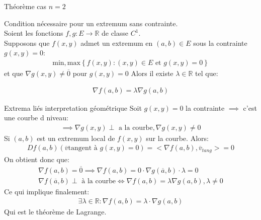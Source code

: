 \begin{parag}{Théorème cas $n = 2$}
    \begin{theoreme}
    Condition nécessaire pour un extremum sans contrainte.\\
    Soient les fonctions $f, g: E \to \mathbb{R}$ de classe $C^1$.\\
    Supposons que $f\left(x, y\right)$ admet un extremum en $\left(a, b\right) \in E$ sous la contrainte $g\left(x, y\right) = 0$:
    \begin{align*} \text{min}, \text{max}\left\{f\left(x, y\right): \left(x, y\right) \in E \text{ et } g\left(x, y\right) = 0\right\} \end{align*}
    et que $\nabla g\left(x, y\right) \neq \overline{0}$ pour $g\left(x, y\right) = 0$ Alors il existe $\lambda \in \mathbb{R}$ tel que:
    \begin{formule}
        \begin{align*} \nabla f\left(a, b\right) = \lambda \nabla g\left(a, b\right) \end{align*}
    \end{formule}
    
    \end{theoreme}
    
\end{parag}


\begin{parag}{Extrema liés interpretation géométrique}
    Soit $g\left(x, y\right) = 0$ la contrainte $\implies$ c'est une courbe d niveau:
    \begin{align*} \implies \nabla g\left(x, y\right) \perp \text{ a la courbe}, \nabla g\left(x, y\right) \neq 0 \end{align*}
    Si $\left(a, b\right)$ est un extremum local de $f\left(x, y\right)$ sur la courbe. Alors: 
    \begin{align*} Df\left(a, b\right) \left(\overline{v} \text{tangent à } g\left(x, y\right) = 0\right) =  <\nabla f\left(a, b\right), \overline{v}_{tang}> = 0 \end{align*}
    On obtient donc que:
    \begin{align*} \nabla f\left(a, b\right) =  \overline{0} \implies \nabla f\left(a, b\right) = 0 \cdot  \nabla g\left(\overline{a}, b\right) \cdot  \lambda = 0\\
        \nabla f\left(\overline{a}, b\right) \perp \text{ à la courbe} \iff \nabla f\left(a, b\right) = \lambda \nabla g\left(a, b\right), \lambda \neq 0
    \end{align*}
    Ce qui implique finalement:
    \begin{align*} \exists \lambda \in \mathbb{R}: \nabla f\left(a, b\right) = \lambda \cdot  \nabla g\left(a, b\right) \end{align*}
    Qui est le théorème de Lagrange.
    
\end{parag}


